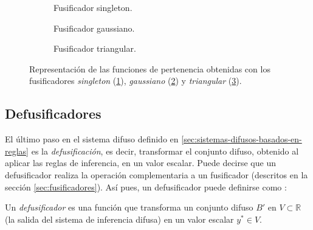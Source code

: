 \begin{figure}[H]
	\centering
	\begin{subfigure}[t]{\textwidth}
		\setlength\figureheight{4cm}
		\setlength\figurewidth{12cm}
		
		\caption{Fusificador singleton.}
		\label{fig:fuzzifier-singleton}
	\end{subfigure}
	
	\vspace{1 cm}
	\begin{subfigure}[t]{\textwidth}
		\setlength\figureheight{4cm}
		\setlength\figurewidth{12cm}
		
		\caption{Fusificador gaussiano.}
		\label{fig:fuzzifier-gaussian}
	\end{subfigure}
	
	\vspace{1 cm}
	\begin{subfigure}[t]{\textwidth}
		\setlength\figureheight{4cm}
		\setlength\figurewidth{12cm}
		
		\caption{Fusificador triangular.}
		\label{fig:fuzzifier-triangular}
	\end{subfigure}
		\caption{Representación de las funciones de pertenencia obtenidas con los fusificadores \emph{singleton} (\ref{fig:fuzzifier-singleton}), \emph{gaussiano} (\ref{fig:fuzzifier-gaussian}) y \emph{triangular} (\ref{fig:fuzzifier-triangular}).}
		\label{fig:fuzzifiers}
\end{figure}

\subsection{Defusificadores}\label{sec:defusificadores}
El último paso en el sistema difuso definido en \ref{sec:sistemas-difusos-basados-en-reglas} es la \emph{defusificación}, es decir, transformar el conjunto difuso, obtenido al aplicar las reglas de inferencia, en un valor escalar. Puede decirse que un defusificador realiza la operación complementaria a un fusificador (descritos en la sección \ref{sec:fusificadores}). Así pues, un defusificador puede definirse como \cite{wang1997}:

\begin{definition}
Un \emph{defusificador} es una función que transforma un conjunto difuso $B'$ en $V \subset \mathbb{R}$ (la salida del sistema de inferencia difusa) en un valor escalar $y^* \in V$.
\end{definition}

